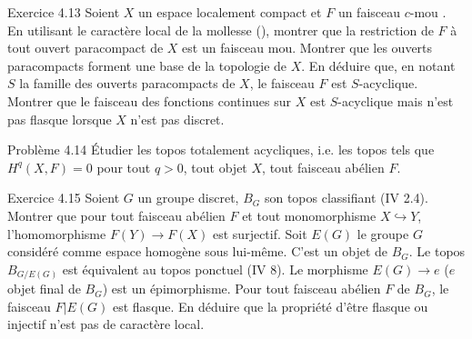 \documentclass[10pt]{../fichiers-configuration-latex/smfart}
\begin{document}
\begin{enonce*}[remark]{Exercice 4.13}
Soient $X$ un espace localement compact et $F$ un faisceau $c$-mou
\cite{SGA4-05:7}. En utilisant le caractère local de la mollesse (\loccit),
montrer que la restriction de $F$ à tout ouvert paracompact de $X$
est un faisceau mou. Montrer que les ouverts paracompacts forment
une base de la topologie de $X$. En déduire que, en notant $S$ la
famille des ouverts paracompacts de $X$, le faisceau $F$ est
$S$-acyclique. Montrer que le faisceau des fonctions continues sur
$X$ est $S$-acyclique mais n'est pas flasque lorsque $X$ n'est pas
discret.
\end{enonce*}

\begin{enonce*}[remark]{Problème 4.14}
Étudier les topos totalement acycliques, i.e. les topos tels que
$H^q (X, F) = 0$ pour tout $q > 0$, tout objet $X$, tout faisceau
abélien $F$.
\end{enonce*}

\begin{enonce*}[remark]{Exercice 4.15}
Soient $G$ un groupe discret, $B_G$ son topos classifiant (IV
2.4). Montrer que pour tout faisceau abélien $F$ et tout
monomorphisme $X \hookrightarrow Y$, l'homomorphisme $F(Y) \to F(X)$
est surjectif. Soit $E(G)$ le groupe $G$ considéré comme espace
homogène sous lui-même. C'est un objet de $B_G$. Le topos
$B_{G/E(G)}$ est équivalent au topos ponctuel (IV 8). Le morphisme
$E(G) \to e$ ($e$ objet final de $B_G$) est un épimorphisme. Pour
tout faisceau abélien $F$ de $B_G$, le faisceau $F | E(G)$ est
flasque. En déduire que la propriété d'être flasque ou
injectif n'est pas de caractère local.
\end{enonce*}
\end{document}
